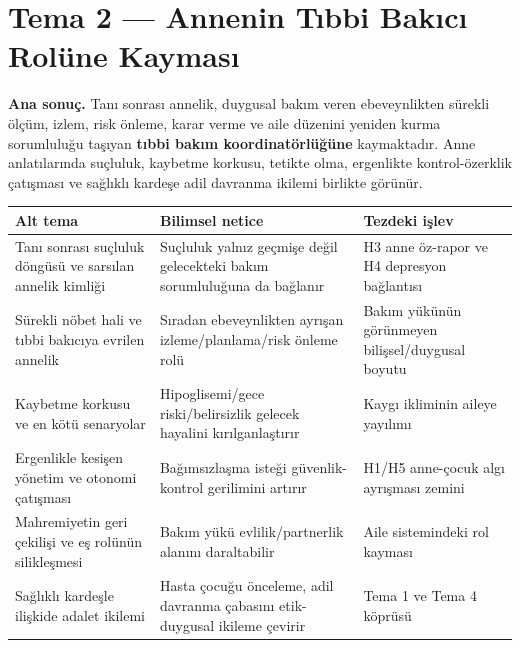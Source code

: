 \documentclass[
  turkish,
  a4paper,
  DIV=11,
  numbers=noendperiod]{scrreprt}
\newcounter{none} %
\begin{document}
\section{Tema 2 --- Annenin Tıbbi Bakıcı Rolüne Kayması}\label{tema-2}

\textbf{Ana sonuç.} Tanı sonrası annelik, duygusal bakım veren
ebeveynlikten sürekli ölçüm, izlem, risk önleme, karar verme ve aile
düzenini yeniden kurma sorumluluğu taşıyan \textbf{tıbbi bakım
koordinatörlüğüne} kaymaktadır. Anne anlatılarında suçluluk, kaybetme
korkusu, tetikte olma, ergenlikte kontrol-özerklik çatışması ve sağlıklı
kardeşe adil davranma ikilemi birlikte görünür.

{\def\LTcaptype{none} %
\begin{longtable}[]{@{}
  >{\raggedright\arraybackslash}p{}
  >{\raggedright\arraybackslash}p{}
  >{\raggedright\arraybackslash}p{}@{}}
\toprule\noalign{}
\begin{minipage}[b]{\linewidth}\raggedright
Alt tema
\end{minipage} & \begin{minipage}[b]{\linewidth}\raggedright
Bilimsel netice
\end{minipage} & \begin{minipage}[b]{\linewidth}\raggedright
Tezdeki işlev
\end{minipage} \\
\midrule\noalign{}
\endhead
\bottomrule\noalign{}
\endlastfoot
Tanı sonrası suçluluk döngüsü ve sarsılan annelik kimliği & Suçluluk
yalnız geçmişe değil gelecekteki bakım sorumluluğuna da bağlanır & H3
anne öz-rapor ve H4 depresyon bağlantısı \\
Sürekli nöbet hali ve tıbbi bakıcıya evrilen annelik & Sıradan
ebeveynlikten ayrışan izleme/planlama/risk önleme rolü & Bakım yükünün
görünmeyen bilişsel/duygusal boyutu \\
Kaybetme korkusu ve en kötü senaryolar & Hipoglisemi/gece
riski/belirsizlik gelecek hayalini kırılganlaştırır & Kaygı ikliminin
aileye yayılımı \\
Ergenlikle kesişen yönetim ve otonomi çatışması & Bağımsızlaşma isteği
güvenlik-kontrol gerilimini artırır & H1/H5 anne-çocuk algı ayrışması
zemini \\
Mahremiyetin geri çekilişi ve eş rolünün silikleşmesi & Bakım yükü
evlilik/partnerlik alanını daraltabilir & Aile sistemindeki rol
kayması \\
Sağlıklı kardeşle ilişkide adalet ikilemi & Hasta çocuğu önceleme, adil
davranma çabasını etik-duygusal ikileme çevirir & Tema 1 ve Tema 4
köprüsü \\
\end{longtable}
}
\end{document}
